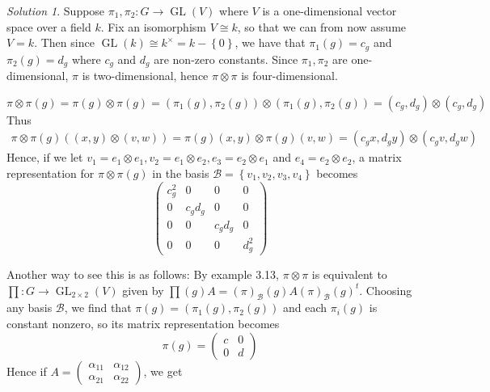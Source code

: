 \documentclass[reqno]{amsart}
\theoremstyle{definition}
\theoremstyle{remark}
\newtheorem*{solution}{Solution}
\DeclareMathOperator{\GL}{GL}
\begin{document}
    \begin{solution}
        Suppose
        $\pi_1,\pi_2 \colon G
        \to \GL (V)$ where
        $V$ is a one-dimensional vector space
        over a field $k$.
        Fix an isomorphism $V \cong k$, so that we
        can from now assume $V = k$.
        Then since
        $\GL (k) \cong k^{\times }
        = k - \left\{ 0 \right\} $,
        we have that
        $\pi_1(g) = c_g$ and
        $\pi_2(g) = d_g$ where
        $c_g$ and $d_g$ are non-zero constants.
        Since $\pi_1,\pi_2$ are one-dimensional,
        $\pi$ is two-dimensional, hence
        $\pi \otimes \pi$ is four-dimensional.

        \[
            \pi \otimes \pi(g) 
            = \pi(g) \otimes \pi(g)
            = \left( \pi_1(g), \pi_2(g) \right) 
            \otimes \left( \pi_1 (g) , \pi_2(g) \right) 
            = \left( c_g, d_g \right) 
            \otimes \left( c_g, d_g \right) 
        \] 
        Thus
        \begin{align*}
            \pi \otimes \pi(g) \left( (x,y) \otimes
            (v,w) \right) 
            = \pi(g) (x,y) \otimes
            \pi(g) (v,w)
            = \left( c_g x, d_g y \right) 
            \otimes \left( c_g v, d_g w \right) 
        \end{align*}
        Hence, if we let
        $v_1 = e_1 \otimes e_1,
        v_2 = e_1 \otimes e_2,
        e_3 = e_2 \otimes e_1$ and
        $e_4 = e_2 \otimes e_2$, a matrix representation for
        $\pi \otimes \pi(g)$ in the basis
        $\mathcal{B} = \left\{ v_1,v_2,v_3,v_4 \right\} $ becomes
        \[
            \begin{pmatrix} c_g^2 & 0 & 0 & 0\\
            0 & c_g d_g & 0 & 0\\
        0 & 0 & c_g d_g & 0\\
     0 & 0 & 0 & d_g^2 \end{pmatrix} 
        \] 

        Another way to see this is as follows: By example 3.13, 
        $\pi \otimes \pi$ is equivalent to
        $\prod \colon G \to 
        \GL_{2 \times 2}(V)$ given by
        $\prod (g) A = 
        \left( \pi \right)_{\mathcal{B}}(g)
        A \left( \pi \right)_{\mathcal{B}}(g)^{t}.
        $ 
        Choosing any basis $\mathcal{B}$, we find that
        $\pi(g) = \left( \pi_1(g), \pi_2(g) \right) $ and
        each $\pi_i(g)$ is constant nonzero, so its matrix 
        representation becomes
        \[
        \pi(g) = 
        \begin{pmatrix} c & 0\\
        0 & d \end{pmatrix} 
        \] 
        Hence if
        $A = \begin{pmatrix} \alpha_{11} & \alpha_{12}\\
        \alpha_{21} & \alpha_{22}\end{pmatrix} $, we get


\end{solution}
\end{document}
